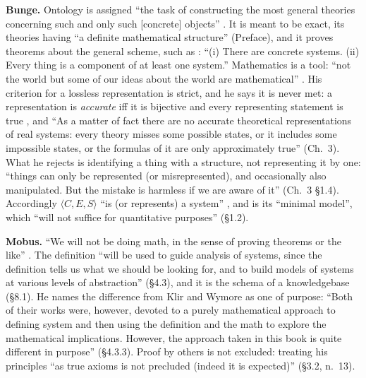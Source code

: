 \documentclass[11pt]{article}
\theoremstyle{definition}
\theoremstyle{remark}
\begin{document}
\textbf{Bunge.} Ontology is assigned ``the task of constructing the most general theories concerning such and only such [concrete] objects'' \cite[Intro.\ \S2]{bunge1977}. It is meant to be exact, its theories having ``a definite mathematical structure'' (Preface), and it proves theorems about the general scheme, such as \cite[Thm.~1.1]{bunge1979}: ``(i) There are concrete systems. (ii) Every thing is a component of at least one system.'' Mathematics is a tool: ``not the world but some of our ideas about the world are mathematical'' \cite[Ch.~3 \S1.3]{bunge1977}. His criterion for a lossless representation is strict, and he says it is never met: a representation is \emph{accurate} iff it is bijective and every representing statement is true \cite[Def.~3.3]{bunge1974a}, and ``As a matter of fact there are no accurate theoretical representations of real systems: every theory misses some possible states, or it includes some impossible states, or the formulas of it are only approximately true'' (Ch.~3). What he rejects is identifying a thing with a structure, not representing it by one: ``things can only be represented (or misrepresented), and occasionally also manipulated. But the mistake is harmless if we are aware of it'' (Ch.~3 \S1.4). Accordingly $\langle C,E,S\rangle$ ``is (or represents) a system'' \cite[\S1.1]{bunge1979}, and is its ``minimal model'', which ``will not suffice for quantitative purposes'' (\S1.2).

\textbf{Mobus.} ``We will not be doing math, in the sense of proving theorems or the like'' \cite[\S1.3.5]{mobus2022}. The definition ``will be used to guide analysis of systems, since the definition tells us what we should be looking for, and to build models of systems at various levels of abstraction'' (\S4.3), and it is the schema of a knowledgebase (\S8.1). He names the difference from Klir and Wymore as one of purpose: ``Both of their works were, however, devoted to a purely mathematical approach to defining system and then using the definition and the math to explore the mathematical implications. However, the approach taken in this book is quite different in purpose'' (\S4.3.3). Proof by others is not excluded: treating his principles ``as true axioms is not precluded (indeed it is expected)'' (\S3.2, n.~13).
\end{document}
